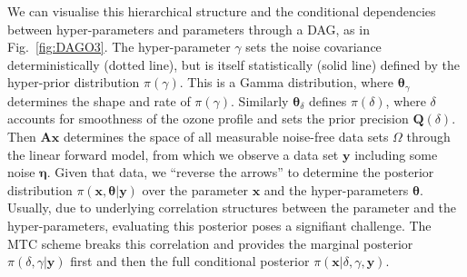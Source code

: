 We can visualise this hierarchical structure and the conditional dependencies between hyper-parameters and parameters through a DAG, as in Fig.~\ref{fig:DAGO3}.
The hyper-parameter $\gamma$ sets the noise covariance deterministically (dotted line), but is itself statistically (solid line) defined by the hyper-prior distribution $\pi(\gamma)$.
This is a Gamma distribution, where $\bm{\theta}_{\gamma}$ determines the shape and rate of $\pi(\gamma)$.
Similarly $\bm{\theta}_{\delta}$ defines $\pi(\delta)$, where $\delta$ accounts for smoothness of the ozone profile and sets the prior precision $\bm{Q}(\delta)$.
Then $\bm{A}\bm{x}$ determines the space of all measurable noise-free data sets $\Omega$ through the linear forward model, from which we observe a data set $\bm{y}$ including some noise $\bm{\eta}$.
Given that data, we ``reverse the arrows'' to determine the posterior distribution $\pi(\bm{x}, \bm{\theta}|\bm{y})$ over the parameter $\bm{x}$ and the hyper-parameters $\bm{\theta}$.
Usually, due to underlying correlation structures between the parameter and the hyper-parameters, evaluating this posterior poses a signifiant challenge.
The MTC scheme breaks this correlation and provides the marginal posterior $\pi(\delta, \gamma | \bm{y})$ first and then the full conditional posterior $\pi(\bm{x}|\delta, \gamma,\bm{y})$.

